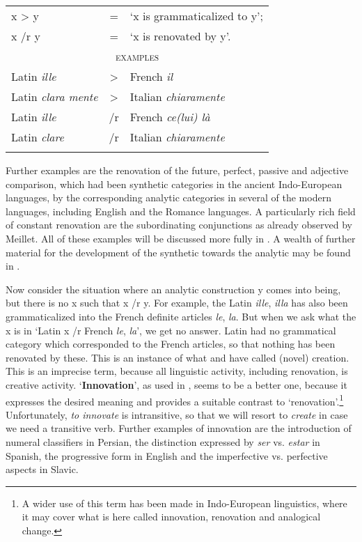 \begin{table}
	\begin{tabular}{lcl}
		\lsptoprule
		x {\textgreater} y & = & ‘x is grammaticalized to y’;\\
		x /r y & = & ‘x is renovated by y’.\\
		\midrule
		\multicolumn{3}{c}{\textsc{examples}}\\
		Latin \textit{ille} &       {\textgreater} &  French \textit{il}\\
		Latin \textit{clara mente} & {\textgreater} &  Italian \textit{chiaramente}\\
		Latin \textit{ille}    &    /r & French \textit{ce(lui) là}\\
		Latin \textit{clare}   &   /r & Italian \textit{chiaramente}\\
		\lspbottomrule
	\end{tabular}
\end{table}	

Further examples are the renovation of the future, perfect, passive and adjective comparison, which had been synthetic categories in the ancient Indo-European languages, by the corresponding analytic categories in several of the modern languages, including English and the Romance languages. A particularly rich field of constant renovation are the subordinating conjunctions as already observed by Meillet. All of these examples will be discussed more fully in . A wealth of further material for the development of the synthetic towards the analytic may be found in \citet[Ch.~I]{Tauli1966}.

Now consider the situation where an analytic construction y comes into being, but there is no x such that x /r y. For example, the Latin \textit{ille}, \textit{illa} has also been grammaticalized into the French definite articles \textit{le}, \textit{la}. But when we ask what the x is in ‘Latin x /r French \textit{le}, \textit{la}’, we get no answer. Latin had no grammatical category which corresponded to the French articles, so that nothing has been renovated by these. This is an instance of what \citet{Meillet1915} and \citet{Traugott1980} have called (novel) creation. This is an imprecise term, because all linguistic activity, including renovation, is creative activity. ‘\textbf{Innovation}’, as used in \citet{Benveniste1968}, seems to be a better one, because it expresses the desired meaning and provides a suitable contrast to ‘renovation’.\footnote{A wider use of this term has been made in Indo-European linguistics, where it may cover what is here called innovation, renovation and analogical change.} Unfortunately, \textit{to innovate }is intransitive, so that we will resort to \textit{create} in case we need a transitive verb. Further examples of innovation are the introduction of numeral classifiers in Persian, the distinction expressed by \textit{ser} vs. \textit{estar} in Spanish, the progressive form in English and the imperfective vs. perfective aspects in Slavic.

